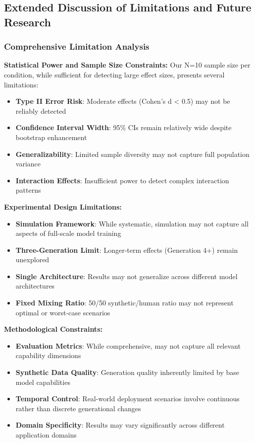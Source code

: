 \documentclass{article}
\begin{document}
\subsection{Extended Discussion of Limitations and Future Research}
\label{appendix:limitations_future}

\subsubsection{Comprehensive Limitation Analysis}

\textbf{Statistical Power and Sample Size Constraints:}
Our N=10 sample size per condition, while sufficient for detecting large effect sizes, presents several limitations:
\begin{itemize}
    \item \textbf{Type II Error Risk}: Moderate effects (Cohen's d < 0.5) may not be reliably detected
    \item \textbf{Confidence Interval Width}: 95\% CIs remain relatively wide despite bootstrap enhancement
    \item \textbf{Generalizability}: Limited sample diversity may not capture full population variance
    \item \textbf{Interaction Effects}: Insufficient power to detect complex interaction patterns
\end{itemize}

\textbf{Experimental Design Limitations:}
\begin{itemize}
    \item \textbf{Simulation Framework}: While systematic, simulation may not capture all aspects of full-scale model training
    \item \textbf{Three-Generation Limit}: Longer-term effects (Generation 4+) remain unexplored
    \item \textbf{Single Architecture}: Results may not generalize across different model architectures
    \item \textbf{Fixed Mixing Ratio}: 50/50 synthetic/human ratio may not represent optimal or worst-case scenarios
\end{itemize}

\textbf{Methodological Constraints:}
\begin{itemize}
    \item \textbf{Evaluation Metrics}: While comprehensive, may not capture all relevant capability dimensions
    \item \textbf{Synthetic Data Quality}: Generation quality inherently limited by base model capabilities
    \item \textbf{Temporal Control}: Real-world deployment scenarios involve continuous rather than discrete generational changes
    \item \textbf{Domain Specificity}: Results may vary significantly across different application domains
\end{itemize}
\end{document}
